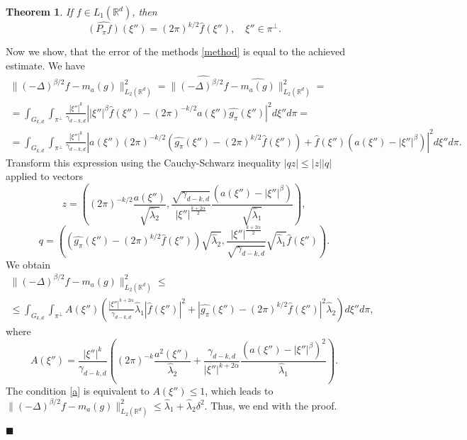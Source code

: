 \documentclass[12pt]{iopart}
\newtheorem{theorem}{Theorem}
\newenvironment{proof}
{\par\noindent{\bf Proof}}
{\hfill$\scriptstyle\blacksquare$}
\begin{document}
\begin{theorem}
\label{projection}
If $f\in L_1(\mathbb R^d)$, then
$$\widehat{(P_\pi f)}(\xi'')=(2\pi)^{k/2}\widehat f(\xi''),\quad \xi''\in\pi^\perp.$$
\end{theorem}

\begin{proof}
Now we show, that the error of the methods \eqref{method} is equal to the achieved estimate.
We have
\begin{multline*}
  \|(-\Delta)^{\beta/2}f-m_a(g)\|^2_{L_2(\mathbb R^d)}=\|\widehat{(-\Delta)^{\beta/2}f}-\widehat{m_a(g)}\|^2_{L_2(\mathbb R^d)}=\\
  =\int_{G_{k,d}}\int_{\pi^\perp}\frac{|\xi''|^k}{\gamma_{d-k,d}}\left||\xi''|^\beta \widehat f(\xi'')-(2\pi)^{-k/2}a(\xi'')\widehat{g_\pi}(\xi'')\right|^2d\xi'' d\pi =\\
  =\int_{G_{k,d}}\int_{\pi^\perp}\frac{|\xi''|^k}{\gamma_{d-k,d}}\left|a(\xi'')(2\pi)^{-k/2}\left(\widehat{g_\pi }(\xi'')-(2\pi)^{k/2}\widehat 
      f(\xi'' )\right)+\widehat
    f(\xi'')\left(a(\xi'')-|\xi''|^\beta\right)\right|^2d\xi'' d\pi .
\end{multline*}
Transform this expression using the Cauchy-Schwarz inequality $|qz|\leqslant |z||q|$ applied to vectors
\[
z=\left((2\pi)^{-k/2}\frac{a(\xi'')}{\sqrt{\widehat\lambda_2}},\frac{\sqrt{\gamma_{d-k,d}}}{|\xi''|^{\frac{k+2\alpha}{2}}}\frac{(a(\xi'')-|\xi''|^\beta)}{\sqrt{\widehat\lambda_1}}\right),
\]
\[
q=\left(\left(\widehat{g_\pi }(\xi'')-(2\pi)^{k/2}\widehat
    f(\xi'' )\right)\sqrt{\widehat\lambda_2},\frac{|\xi''|^{\frac{k+2\alpha}{2}}}{\sqrt{\gamma_{d-k,d}}}\sqrt{\widehat\lambda_1}\widehat
  f(\xi'' )\right).
\]
We obtain
\begin{multline*}  
  \|(-\Delta)^{\beta/2}f-m_a(g)\|^2_{L_2(\mathbb R^d)}\leqslant  \\
  \leqslant \int_{G_{k,d}}\int_{\pi^\perp}
  A(\xi'')\left(\frac{|\xi''|^{k+2\alpha}}{\gamma_{d-k,d}}\widehat\lambda_1|\widehat
    f(\xi'')|^2+\left|\widehat{g_\pi
      }(\xi'')-(2\pi)^{k/2}\widehat f(\xi''
      )\right|^2\widehat\lambda_2\right)d\xi'' d\pi ,
\end{multline*}
where
  \[
  A(\xi'')=\frac{|\xi''|^k}{\gamma_{d-k,d}}\left((2\pi)^{-k}\frac{a^2(\xi'')}{\widehat\lambda_2}+\frac{\gamma_{d-k,d}}{|\xi''|^{k+2\alpha}}\frac{(a(\xi'')-|\xi''|^\beta)^2}{\widehat\lambda_1}\right).
  \]
  The condition \eqref{a} is equivalent to $A(\xi'')\leqslant 1$, which leads to $ \|(-\Delta)^{\beta/2}f-m_a(g)\|^2_{L_2(\mathbb R^d)}\leqslant
  \widehat\lambda_1+\widehat\lambda_2\delta^2.$
Thus, we end with the proof.

\end{proof}
\end{document}
